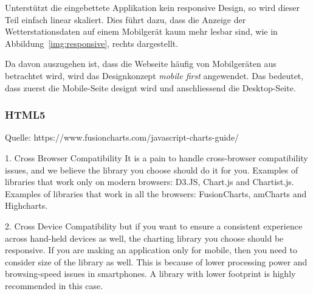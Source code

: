 \noindent
Unterstützt die eingebettete Applikation kein responsive Design, so wird dieser Teil einfach linear skaliert. Dies führt dazu, dass die Anzeige der Wetterstationsdaten auf einem Mobilgerät kaum mehr lesbar sind, wie in Abbildung~\ref{img:responsive}, rechts dargestellt.
\newline



\noindent
Da davon auszugehen ist, dass die Webseite häufig von Mobilgeräten aus betrachtet wird, wird das Designkonzept \textit{mobile first} angewendet. Das bedeutet, dass zuerst die Mobile-Seite designt wird und anschliessend die Desktop-Seite.





\subsubsection*{HTML5}
\newline
{}\newline
{}\newline
{}\newline
{}\newline

Quelle: https://www.fusioncharts.com/javascript-charts-guide/


1. Cross Browser Compatibility
It is a pain to handle cross-browser compatibility issues, and we believe the library you choose should do it for you.
Examples of libraries that work only on modern browsers: D3.JS, Chart.js and Chartist.js.
Examples of libraries that work in all the browsers: FusionCharts, amCharts and Highcharts.

2. Cross Device Compatibility
but if you want to ensure a consistent experience across hand-held devices as well, the charting library you choose should be responsive.
If you are making an application only for mobile, then you need to consider size of the library as well. This is because of lower processing power and browsing-speed issues in smartphones. A library with lower footprint is highly recommended in this case.

